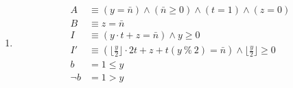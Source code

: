 \documentclass{article}
\begin{document}
\begin{enumerate}[1)]
\begin{enumerate}
        \item %
        \begin{align*}
            A &\equiv (y = \bar{n}) \land (\bar{n} \geq 0) \land (t = 1) \land (z = 0) \\
            B &\equiv z = \bar{n} \\
            I &\equiv (y \cdot t + z = \bar{n}) \land y \geq 0 \\
            I' &\equiv (\lfloor \frac{y}{2} \rfloor \cdot 2t + z + t (y\ \%\ 2) = \bar{n})
            \land \lfloor \frac{y}{2} \rfloor \geq 0 \\
            b &= 1 \leq y \\
            \neg b &= 1 > y
        \end{align*}

    \end{enumerate}
\end{enumerate}
\end{document}
